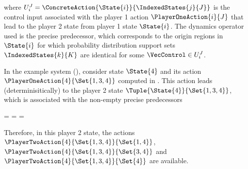     where $U_i^J = \ConcreteAction{\State{i}}{\IndexedStates{j}{J}}$ is the control input associated with the player 1 action $\PlayerOneAction{i}{J}$ that lead to the player 2 state from player 1 state $\State{i}$.
    The dynamics operator used is the precise predecessor, which corresponds to the origin regions in $\State{i}$ for which probability distribution support sets $\IndexedStates{k}{K}$ are identical for some $\VecControl \in U_i^J$.

    In the example system (), consider state $\State{4}$ and its action $\PlayerOneAction{4}{\Set{1, 3, 4}}$ computed in .
    This action leads (determinisitically) to the player 2 state $\Tuple{\State{4}}{\Set{1, 3, 4}}$, which is associated with the non-empty precise predecessors

    \startformula
        \startalign[n=2,align={left,left}]
            \NC {}
            \NC =  \EndComma
            \NR
            \NC {}
            \NC =  \EndAnd
            \NR
            \NC {}
            \NC =  \EndPeriod
            \NR
        \stopalign
    \stopformula

    Therefore, in this player 2 state, the actions $\PlayerTwoAction{4}{\Set{1, 3, 4}}{\Set{1, 4}}$, $\PlayerTwoAction{4}{\Set{1, 3, 4}}{\Set{3, 4}}$ and $\PlayerTwoAction{4}{\Set{1, 3, 4}}{\Set{4}}$ are available.

\stopsubsection


